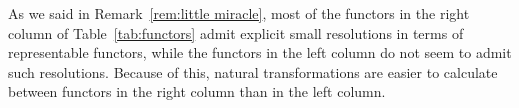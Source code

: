 \documentclass[psamsfonts]{amsart}
\theoremstyle{plain}
\theoremstyle{definition}
\theoremstyle{remark}
\newcommand{\Z}{\mathbb{Z}}
\newcommand{\catname}[1]{{\normalfont\textbf{#1}}}
\newcommand{\spaces}{\catname{S}_*}
\newcommand{\fr}{\allfr^{\mathrm{fg}}}
\newcommand{\allfr}{\catname{Fr}}
\newcommand{\ab}{\catname{Ab}}
\newcommand{\ch}{\catname{Ch}}
\newcommand{\abelianization}{\mathrm{ab}}
\newcommand{\tensor}{\mathrm{T}}
\newcommand{\symm}{\mathrm{S}}
\newcommand{\Passi}{\mathrm{Pa}}
\begin{document}



As we said in Remark~\ref{rem:little miracle}, most of the functors in the right column of  Table~\ref{tab:functors} admit explicit small resolutions in terms of representable functors, while the functors in the left column do not seem to admit such resolutions. Because of this, natural transformations are easier to calculate between functors in the right column than in the left column.
\end{document}
